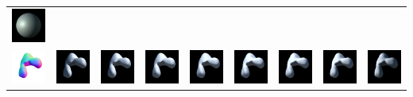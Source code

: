 \begin{center}
\begin{longtable}{@{}c@{}c@{}c@{}c@{}c@{}c@{}c@{}c@{}c@{}}
\includegraphics[width=0.1\linewidth]{training/42_7.png} \\
\includegraphics[width=0.1\linewidth]{training/43_gt.png} & \includegraphics[width=0.1\linewidth]{training/43_0.png} &
\includegraphics[width=0.1\linewidth]{training/43_1.png} & \includegraphics[width=0.1\linewidth]{training/43_2.png} &
\includegraphics[width=0.1\linewidth]{training/43_3.png} & \includegraphics[width=0.1\linewidth]{training/43_4.png} &
\includegraphics[width=0.1\linewidth]{training/43_5.png} & \includegraphics[width=0.1\linewidth]{training/43_6.png} &
\includegraphics[width=0.1\linewidth]{training/43_7.png} \\

\end{longtable}
\end{center}
